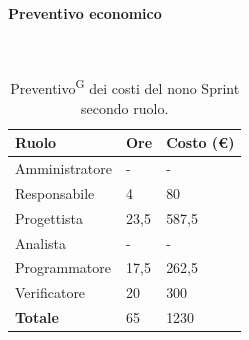 \documentclass[8pt]{article}
\newcommand{\glossterm}[1]{#1\textsuperscript{G}} %
\newcommand{\subsubsubsection}[1]{\paragraph{#1}\mbox{}\\}
\begin{document}
\subsubsubsection{Preventivo economico}
    \begin{table}[ht!]
	\centering
	\begin{tabular}{p{4cm} p{1cm} p{2cm}}
        \toprule
        \textbf{Ruolo} & \textbf{Ore} & \textbf{Costo (€)} \\
        \midrule
        Amministratore & - & - \\ 
        Responsabile & 4 & 80 \\ 
        Progettista & 23,5 & 587,5 \\ 
        Analista & - & - \\ 
        Programmatore & 17,5 & 262,5 \\ 
        Verificatore & 20 & 300 \\
        \midrule 
        \textbf{Totale} & 65 & 1230 \\ 
        \bottomrule
    \end{tabular}
    \caption{\glossterm{Preventivo} dei costi del nono Sprint secondo ruolo.}
	\label{table:Preventivo dei costi del nono Sprint secondo ruolo}
\end{table}
\end{document}
